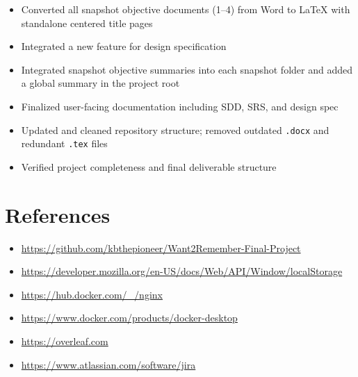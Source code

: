 \documentclass[12pt]{article}
\begin{document}
\begin{itemize}
  \item Converted all snapshot objective documents (1--4) from Word to LaTeX with standalone centered title pages
  \item Integrated a new feature for design specification
  \item Integrated snapshot objective summaries into each snapshot folder and added a global summary in the project root
  \item Finalized user-facing documentation including SDD, SRS, and design spec
  \item Updated and cleaned repository structure; removed outdated \texttt{.docx} and redundant \texttt{.tex} files
  \item Verified project completeness and final deliverable structure
\end{itemize}

\section{References}

\begin{itemize}
  \item \url{https://github.com/kbthepioneer/Want2Remember-Final-Project}
  \item \url{https://developer.mozilla.org/en-US/docs/Web/API/Window/localStorage}
  \item \url{https://hub.docker.com/_/nginx}
  \item \url{https://www.docker.com/products/docker-desktop}
  \item \url{https://overleaf.com}
  \item \url{https://www.atlassian.com/software/jira}
\end{itemize}
\end{document}
